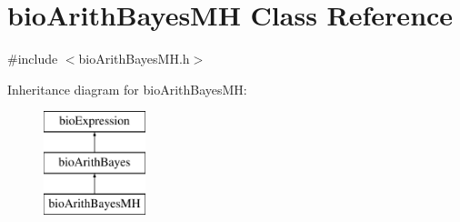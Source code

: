 \hypertarget{classbio_arith_bayes_m_h}{}\section{bio\+Arith\+Bayes\+MH Class Reference}
\label{classbio_arith_bayes_m_h}


{\ttfamily \#include $<$bio\+Arith\+Bayes\+M\+H.\+h$>$}

Inheritance diagram for bio\+Arith\+Bayes\+MH\+:\begin{figure}[H]
\begin{center}
\leavevmode
\includegraphics[height=3.000000cm]{classbio_arith_bayes_m_h}
\end{center}
\end{figure}
